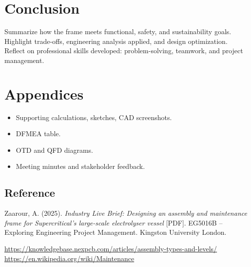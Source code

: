 \documentclass{report}
\begin{document}
\newpage

\section{Conclusion}
\color{red!50!black}
Summarize how the frame meets functional, safety, and sustainability goals. Highlight trade-offs, engineering analysis applied, and design optimization. Reflect on professional skills developed: problem-solving, teamwork, and project management.
\color{black}

\newpage

\section{Appendices}
\color{red!50!black}
\begin{itemize}[itemsep=-1mm]
	\item Supporting calculations, sketches, CAD screenshots.
	\item DFMEA table.
	\item OTD and QFD diagrams.
	\item Meeting minutes and stakeholder feedback.
\end{itemize}
\color{black}


\newpage

\subsection*{Reference}
Zaarour, A. (2025). \textit{Industry Live Brief: Designing an assembly and maintenance frame for Supercritical's large-scale electrolyser vessel} [PDF]. EG5016B – Exploring Engineering Project Management. Kingston University London.

\url{https://knowledgebase.nexpcb.com/articles/assembly-types-and-levels/}
\url{https://en.wikipedia.org/wiki/Maintenance}
\end{document}
